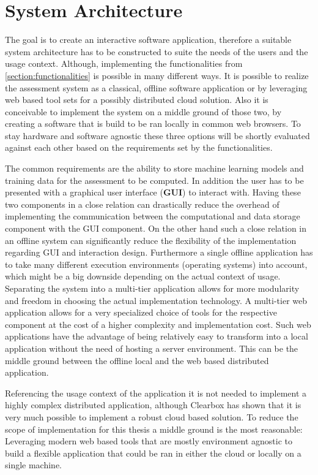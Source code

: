 \documentclass[11pt,a4paper,english]{scrreprt}
\begin{document}
\section{System Architecture}\label{section:system_architecture}
The goal is to create an interactive software application, therefore a suitable system architecture has to be constructed to suite the needs of the users and the usage context. Although, implementing the functionalities from \autoref{section:functionalities} is possible in many different ways. It is possible to realize the assessment system as a classical, offline software application or by leveraging web based tool sets for a possibly distributed cloud solution. Also it is conceivable to implement the system on a middle ground of those two, by creating a software that is build to be ran locally in common web browsers. To stay hardware and software agnostic these three options will be shortly evaluated against each other based on the requirements set by the functionalities.

The common requirements are the ability to store machine learning models and training data for the assessment to be computed. In addition the user has to be presented with a graphical user interface (\textbf{GUI}) to interact with. Having these two components in a close relation can drastically reduce the overhead of implementing the communication between the computational and data storage component with the GUI component. On the other hand such a close relation in an offline system can significantly reduce the flexibility of the implementation regarding GUI and interaction design. Furthermore a single offline application has to take many different execution environments (operating systems) into account, which might be a big downside depending on the actual context of usage. Separating the system into a multi-tier application allows for more modularity and freedom in choosing the actual implementation technology. A multi-tier web application allows for a very specialized choice of tools for the respective component at the cost of a higher complexity and implementation cost. Such web applications have the advantage of being relatively easy to transform into a local application without the need of hosting a server environment. This can be the middle ground between the offline local and the web based distributed application.

Referencing the usage context of the application it is not needed to implement a highly complex distributed application, although Clearbox has shown that it is very much possible to implement a robust cloud based solution. To reduce the scope of implementation for this thesis a middle ground is the most reasonable: Leveraging modern web based tools that are mostly environment agnostic to build a flexible application that could be ran in either the cloud or locally on a single machine.
\end{document}
